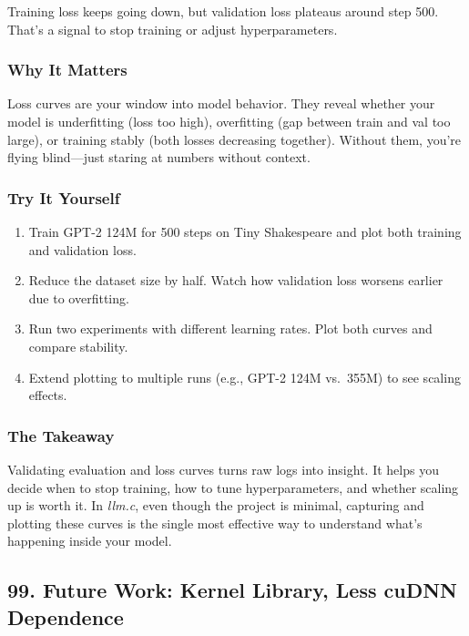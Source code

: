 \documentclass[
  letterpaper,
  DIV=11,
  numbers=noendperiod]{scrreprt}
\providecommand{\tightlist}{%
  \setlength{\itemsep}{0pt}\setlength{\parskip}{0pt}}
\begin{document}
Training loss keeps going down, but validation loss plateaus around step
500. That's a signal to stop training or adjust hyperparameters.

\subsubsection{Why It Matters}\label{why-it-matters-72}

Loss curves are your window into model behavior. They reveal whether
your model is underfitting (loss too high), overfitting (gap between
train and val too large), or training stably (both losses decreasing
together). Without them, you're flying blind---just staring at numbers
without context.

\subsubsection{Try It Yourself}\label{try-it-yourself-86}

\begin{enumerate}
\def\labelenumi{\arabic{enumi}.}
\tightlist
\item
  Train GPT-2 124M for 500 steps on Tiny Shakespeare and plot both
  training and validation loss.
\item
  Reduce the dataset size by half. Watch how validation loss worsens
  earlier due to overfitting.
\item
  Run two experiments with different learning rates. Plot both curves
  and compare stability.
\item
  Extend plotting to multiple runs (e.g., GPT-2 124M vs.~355M) to see
  scaling effects.
\end{enumerate}

\subsubsection{The Takeaway}\label{the-takeaway-87}

Validating evaluation and loss curves turns raw logs into insight. It
helps you decide when to stop training, how to tune hyperparameters, and
whether scaling up is worth it. In \emph{llm.c}, even though the project
is minimal, capturing and plotting these curves is the single most
effective way to understand what's happening inside your model.

\subsection{99. Future Work: Kernel Library, Less cuDNN
Dependence}\label{future-work-kernel-library-less-cudnn-dependence}
\end{document}
